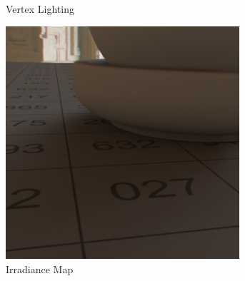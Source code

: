 \begin{figure}[h]
\begin{subfigure}[t]{0.33\textwidth}
			\caption{Vertex Lighting}
		\end{subfigure}
		\begin{subfigure}[t]{0.33\textwidth}
			\center
			\includegraphics[width=0.95\textwidth]{pic/irrmap-shaderball_e4-irrmap.png}
			\caption{Irradiance Map}
		\end{subfigure}
		\caption{}
	\end{figure}

